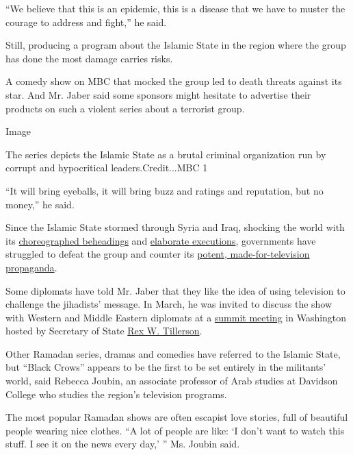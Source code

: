 ``We believe that this is an epidemic, this is a disease that we have to
muster the courage to address and fight,'' he said.

Still, producing a program about the Islamic State in the region where
the group has done the most damage carries risks.

A comedy show on MBC that mocked the group led to death threats against
its star. And Mr. Jaber said some sponsors might hesitate to advertise
their products on such a violent series about a terrorist group.

Image

The series depicts the Islamic State as a brutal criminal organization
run by corrupt and hypocritical leaders.Credit...MBC 1

``It will bring eyeballs, it will bring buzz and ratings and reputation,
but no money,'' he said.

Since the Islamic State stormed through Syria and Iraq, shocking the
world with its
\href{https://www.nytimes3xbfgragh.onion/2014/08/20/world/middleeast/isis-james-foley-syria-execution.html}{choreographed
beheadings} and
\href{https://www.nytimes3xbfgragh.onion/2015/02/04/world/middleeast/isis-said-to-burn-captive-jordanian-pilot-to-death-in-new-video.html}{elaborate
executions}, governments have struggled to defeat the group and counter
its
\href{https://www.nytimes3xbfgragh.onion/2014/08/31/world/middleeast/isis-displaying-a-deft-command-of-varied-media.html?_r=0}{potent,
made-for-television propaganda}.

Some diplomats have told Mr. Jaber that they like the idea of using
television to challenge the jihadists' message. In March, he was invited
to discuss the show with Western and Middle Eastern diplomats at a
\href{https://www.nytimes3xbfgragh.onion/2017/03/22/world/middleeast/rex-tillerson-isis.html}{summit
meeting} in Washington hosted by Secretary of State
\href{http://topics.nytimes3xbfgragh.onion/top/reference/timestopics/people/t/rex_w_tillerson/index.html?inline=nyt-per}{Rex
W. Tillerson}.

Other Ramadan series, dramas and comedies have referred to the Islamic
State, but ``Black Crows'' appears to be the first to be set entirely in
the militants' world, said Rebecca Joubin, an associate professor of
Arab studies at Davidson College who studies the region's television
programs.

The most popular Ramadan shows are often escapist love stories, full of
beautiful people wearing nice clothes. ``A lot of people are like: `I
don't want to watch this stuff. I see it on the news every day,' '' Ms.
Joubin said.

